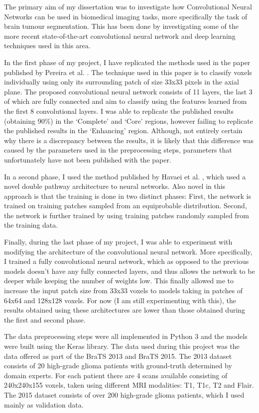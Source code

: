\documentclass[12pt]{report}
\begin{document}
The primary aim of my dissertation was to investigate how Convolutional Neural Networks can be used in biomedical imaging tasks, more specifically the task of brain tumour segmentation. This has been done by investigating some of the more recent state-of-the-art convolutional neural network and deep learning techniques used in this area.

In the first phase of my project, I have replicated the methods used in the paper published by Pereira et al. \cite{pereira}. The technique used in this paper is to classify voxels individually using only its surrounding patch of size 33x33 pixels in the axial plane. The proposed convolutional neural network consists of 11 layers, the last 3 of which are fully connected and aim to classify using the features learned from the first 8 convolutional layers. I was able to replicate the published results (obtaining 90\%) in the `Complete' and `Core' regions, however failing to replicate the published results in the `Enhancing' region. Although, not entirely certain why there is a discrepancy between the results, it is likely that this difference was caused by the parameters used in the preprocessing steps, parameters that unfortunately have not been published with the paper.

In a second phase, I used the method published by Havaei et al. \cite{havaei}, which used a novel double pathway architecture to neural networks. Also novel in this approach is that the training is done in two distinct phases: First, the network is trained on training patches sampled from an equiprobable distribution. Second, the network is further trained by using training patches randomly sampled from the training data.

Finally, during the last phase of my project, I was able to experiment with modifying the architecture of the convolutional neural network. More specifically, I trained a fully convolutional neural network, which as opposed to the previous models doesn't have any fully connected layers, and thus allows the network to be deeper while keeping the number of weights low. This finally allowed me to increase the input patch size from 33x33 voxels to models taking in patches of 64x64 and 128x128 voxels. For now (I am still experimenting with this), the results obtained using these architectures are lower than those obtained during the first and second phase.

The data preprocessing steps were all implemented in Python 3 and the models were built using the Keras library. The data used during this project was the data offered as part of the BraTS 2013 and BraTS 2015. The 2013 dataset consists of 20 high-grade glioma patients with ground-truth determined by domain experts. For each patient there are 4 scans available consisting of 240x240x155 voxels, taken using different MRI modalities: T1, T1c, T2 and Flair. The 2015 dataset consists of over 200 high-grade glioma patients, which I used mainly as validation data.
\end{document}
